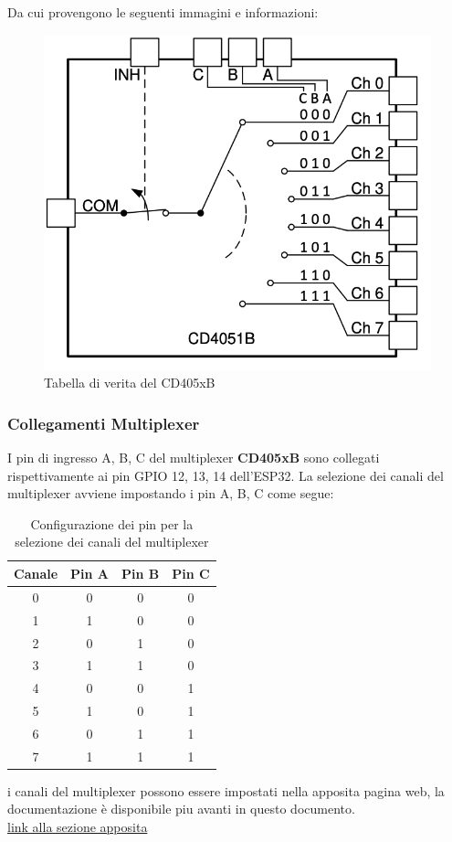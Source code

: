 \documentclass[12pt,a4paper]{report}
\begin{document}
Da cui provengono le seguenti immagini e informazioni:
\begin{figure}[H]
    \centering
    \includegraphics[width=0.5\linewidth]{../image/CD405xB.png}
    \caption{Tabella di verita del CD405xB}
\end{figure}

\subsubsection{Collegamenti Multiplexer}

I pin di ingresso A, B, C del multiplexer \textbf{CD405xB} sono collegati rispettivamente ai pin GPIO 12, 13, 14 dell'ESP32. La selezione dei canali del multiplexer avviene impostando i pin A, B, C come segue:

\begin{table}[H]
    \centering
    \begin{tabular}{|c|c|c|c|}
        \hline
        \textbf{Canale} & \textbf{Pin A} & \textbf{Pin B} & \textbf{Pin C} \\ \hline
        0 & 0 & 0 & 0 \\ \hline
        1 & 1 & 0 & 0 \\ \hline
        2 & 0 & 1 & 0 \\ \hline
        3 & 1 & 1 & 0 \\ \hline
        4 & 0 & 0 & 1 \\ \hline
        5 & 1 & 0 & 1 \\ \hline
        6 & 0 & 1 & 1 \\ \hline
        7 & 1 & 1 & 1 \\ \hline
    \end{tabular}
    \caption{Configurazione dei pin per la selezione dei canali del multiplexer}
\end{table}

i canali del multiplexer possono essere impostati nella apposita pagina web, la documentazione è disponibile piu avanti in questo documento. \\
\hyperref[lbl_webserver]{link alla sezione apposita}
\end{document}
